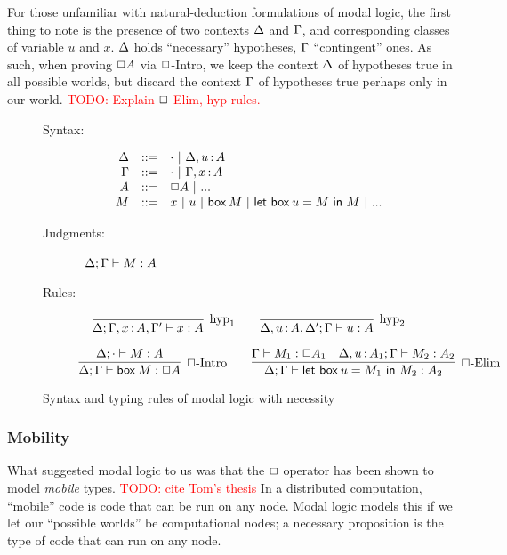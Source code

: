 \documentclass[11pt]{article}
\newcommand{\todo}[1]{\textcolor{red}{\small TODO: #1}}
\begin{document}
For those unfamiliar with natural-deduction formulations of modal logic, the
first thing to note is the presence of two contexts $\Delta$ and $\Gamma$, and
corresponding classes of variable $u$ and $x$. $\Delta$ holds ``necessary''
hypotheses, $\Gamma$ ``contingent'' ones. As such, when proving $\Box A$ via
$\Box$-Intro, we keep the context $\Delta$ of hypotheses true in all possible
worlds, but discard the context $\Gamma$ of hypotheses true perhaps only in our
world. \todo{Explain $\Box$-Elim, hyp rules.}

\begin{figure}
  \begin{description}
  \item[Syntax:]
    \[\begin{array}{rcl}
      \Delta &::=& \cdot ~|~ \Delta, u \mathop{:} A\\
      \Gamma &::=& \cdot ~|~ \Gamma, x \mathop{:} A\\
      A &::=& \Box A ~|~ ...\\
      M &::=& x ~|~ u ~|~ \textsf{box}\:{M} ~|~ \textsf{let}~{\textsf{box}\:{u}}={M}~\textsf{in}~{M} ~|~ ...\\
    \end{array}\]

  \item[Judgments:]\ $\Delta; \Gamma \vdash M : A$

  \item[Rules:]
    \[
    \infer[\text{hyp}_1]{\D;\G, x \of A, \G' \ent x \isa A}{} \qquad
    \infer[\text{hyp}_2]{\D, u \of A, \D'; \G \ent u \isa A}{}
    \]

    \[
    \infer[\nec\text{-Intro}]{\D;\G \ent \ebox{M} \isa \nec A}{
      \D; \ecx \ent M \isa A}
    \qquad
    \infer[\nec\text{-Elim}]{\D;\G \ent \letbox{u}{M_1}{M_2} \isa A_2}{
      \G \ent M_1 \isa \nec A_1 &
      \D,u \of A_1; \G \ent M_2 \isa A_2}
    \]
  \end{description}
  \label{fig:modal}
  \caption{Syntax and typing rules of modal logic with necessity}
\end{figure}

\subsubsection{Mobility}
What suggested modal logic to us was that the $\Box$ operator has been shown to
model \emph{mobile} types. \todo{cite Tom's thesis} In a distributed
computation, ``mobile'' code is code that can be run on any node. Modal logic
models this if we let our ``possible worlds'' be computational nodes; a
necessary proposition is the type of code that can run on any node.
\end{document}
